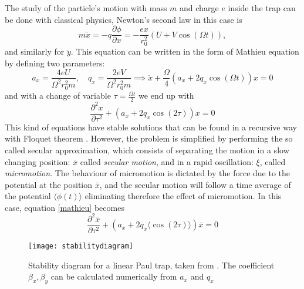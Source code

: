 The study of the particle's motion with mass $m$ and charge $e$ inside the trap can be done with classical physics, Newton's second law in this case is
\begin{equation}
m\ddot{x} = -q \frac{\partial \phi}{\partial x} = - \frac{ex}{r_0^2}\left(U + V \cos(\Omega t) \right),
\end{equation}
and similarly for $\ddot{y}$. This equation can be written in the form of Mathieu equation by defining two parameters:
\begin{equation}
a_x = \frac{4eU}{\Omega^2r_0^2m}, \quad q_x = \frac{2eV}{\Omega^2r_0^2m} \implies \ddot{x} +\frac{\Omega}{4} \left(a_x + 2q_x \cos(\Omega t )\right)x = 0
\end{equation}
and with a change of variable $\tau = \frac{\Omega t}{2}$ we end up with
\begin{equation}
\label{mathieu}
\frac{\partial^2 x}{\partial \tau^2}+\left(a_x + 2q_x \cos(2\tau)\right)x = 0
\end{equation}
This kind of equations have stable solutions that can be found in a recursive way with Floquet theorem \cite{iondynamic}. However, the problem is simplified by performing the so called secular approximation, which consists of separating the motion in a slow changing position: $\bar{x}$ called \emph{secular motion}, and in a rapid oscillation: $\xi$, called \emph{micromotion}. The behaviour of micromotion is dictated by the force due to the potential at the position $\bar{x}$, and the secular motion will follow a time average of the potential $\langle \phi(t) \rangle$ eliminating therefore the effect of micromotion. In this case, equation \eqref{mathieu} becomes
\begin{equation}
\frac{\partial^2 \bar{x}}{\partial \tau^2} + \left(a_x + 2q_x \langle\cos(2\tau)\rangle\right)\bar{x} = 0
\end{equation}

\begin{figure}
\centering
\texttt{[image: stabilitydiagram]}
\caption{Stability diagram for a linear Paul trap, taken from \cite{iondynamic}. The coefficient $\beta_x,\beta_y$ can be calculated numerically from $a_x$ and $q_x$}
\label{stabilitydiagram}
\end{figure}



